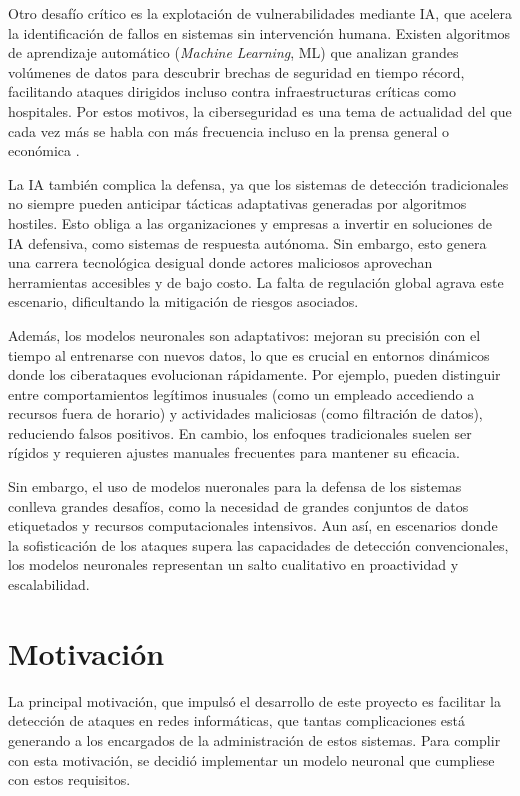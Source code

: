 Otro desafío crítico es la explotación de vulnerabilidades mediante IA, que acelera la identificación de fallos en sistemas sin intervención humana. Existen algoritmos de aprendizaje automático (\textit{Machine Learning}, ML) que analizan grandes volúmenes de datos para descubrir brechas de seguridad en tiempo récord, facilitando ataques dirigidos incluso contra infraestructuras críticas como hospitales. Por estos motivos, la ciberseguridad es una tema de actualidad del que cada vez más se habla con más frecuencia incluso en la prensa general o económica \cite{rundle2024ai}.

La IA también complica la defensa, ya que los sistemas de detección tradicionales no siempre pueden anticipar tácticas adaptativas generadas por algoritmos hostiles. Esto obliga a las organizaciones y empresas a invertir en soluciones de IA defensiva, como sistemas de respuesta autónoma. Sin embargo, esto genera una carrera tecnológica desigual donde actores maliciosos aprovechan herramientas accesibles y de bajo costo. La falta de regulación global agrava este escenario, dificultando la mitigación de riesgos asociados.  

Además, los modelos neuronales son adaptativos: mejoran su precisión con el tiempo al entrenarse con nuevos datos, lo que es crucial en entornos dinámicos donde los ciberataques evolucionan rápidamente. Por ejemplo, pueden distinguir entre comportamientos legítimos inusuales (como un empleado accediendo a recursos fuera de horario) y actividades maliciosas (como filtración de datos), reduciendo falsos positivos. En cambio, los enfoques tradicionales suelen ser rígidos y requieren ajustes manuales frecuentes para mantener su eficacia.

Sin embargo, el uso de modelos nueronales para la defensa de los sistemas conlleva grandes desafíos, como la necesidad de grandes conjuntos de datos etiquetados y recursos computacionales intensivos. Aun así, en escenarios donde la sofisticación de los ataques supera las capacidades de detección convencionales, los modelos neuronales representan un salto cualitativo en proactividad y escalabilidad. 



\section{Motivación} \label{sec.motivacion}

La principal motivación, que impulsó el desarrollo de este proyecto es facilitar la detección de ataques en redes informáticas, que tantas complicaciones está generando a los encargados de la administración de estos sistemas. Para complir con esta motivación, se decidió implementar un modelo neuronal que cumpliese con estos requisitos.

